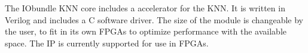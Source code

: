 The IObundle KNN core includes a accelerator for the KNN. It is written in Verilog 
and includes a C software driver. The size of the module is changeable by the user, 
to fit in its own FPGAs to optimize performance with the available space.  The IP is 
currently supported for use in FPGAs.
